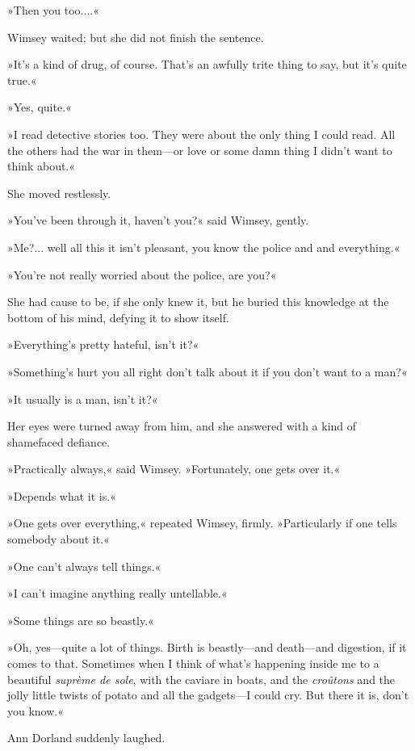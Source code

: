 »Then you too....«

Wimsey waited; but she did not finish the sentence.

»It's a kind of drug, of course. That's an awfully trite thing to say, but it's quite true.«

»Yes, quite.«

»I read detective stories too. They were about the only thing I could read. All the others had the war in them—or love \textellipsis  or some damn thing I didn't want to think about.«

She moved restlessly.

»You've been through it, haven't you?« said Wimsey, gently.

»Me?... well \textellipsis  all this \textellipsis  it isn't pleasant, you know \textellipsis  the police \textellipsis  and \textellipsis  and everything.«

»You're not really worried about the police, are you?«

She had cause to be, if she only knew it, but he buried this knowledge at the bottom of his mind, defying it to show itself.

»Everything's pretty hateful, isn't it?«

»Something's hurt you \textellipsis  all right \textellipsis  don't talk about it if you don't want to \textellipsis  a man?«

»It usually is a man, isn't it?«

Her eyes were turned away from him, and she answered with a kind of shamefaced defiance.

»Practically always,« said Wimsey. »Fortunately, one gets over it.«

»Depends what it is.«

»One gets over everything,« repeated Wimsey, firmly. »Particularly if one tells somebody about it.«

»One can't always tell things.«

»I can't imagine anything really untellable.«

»Some things are so beastly.«

»Oh, yes—quite a lot of things. Birth is beastly—and death—and digestion, if it comes to that. Sometimes when I think of what's happening inside me to a beautiful \textit{suprème de sole}, with the caviare in boats, and the \textit{croûtons} and the jolly little twists of potato and all the gadgets—I could cry. But there it is, don't you know.«

Ann Dorland suddenly laughed.

